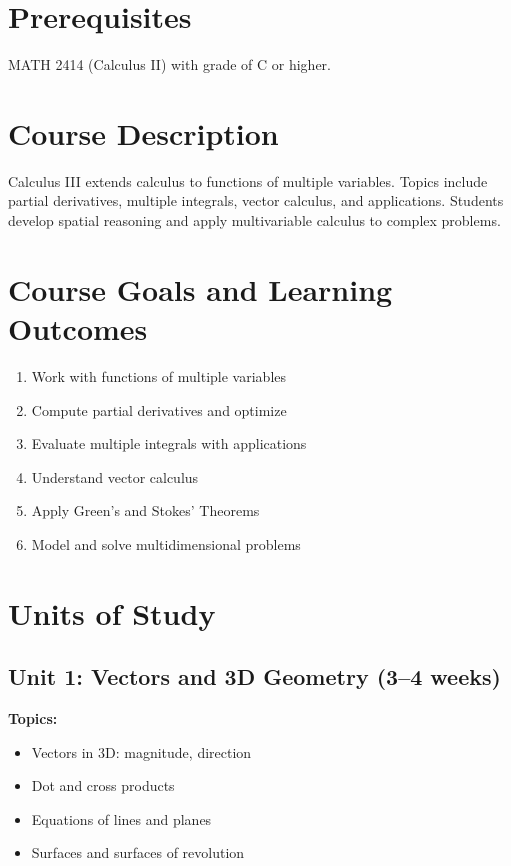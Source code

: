 \documentclass[12pt,oneside]{book}
\begin{document}
\section{Prerequisites}

MATH 2414 (Calculus II) with grade of C or higher.

\section{Course Description}

Calculus III extends calculus to functions of multiple variables. Topics include partial derivatives, multiple integrals, vector calculus, and applications. Students develop spatial reasoning and apply multivariable calculus to complex problems.

\section{Course Goals and Learning Outcomes}

\begin{enumerate}
    \item Work with functions of multiple variables
    \item Compute partial derivatives and optimize
    \item Evaluate multiple integrals with applications
    \item Understand vector calculus
    \item Apply Green's and Stokes' Theorems
    \item Model and solve multidimensional problems
\end{enumerate}

\section{Units of Study}

\subsection{Unit 1: Vectors and 3D Geometry (3--4 weeks)}

\textbf{Topics:}
\begin{itemize}
    \item Vectors in 3D: magnitude, direction
    \item Dot and cross products
    \item Equations of lines and planes
    \item Surfaces and surfaces of revolution
\end{itemize}
\end{document}
